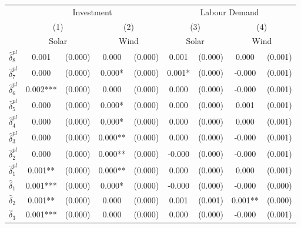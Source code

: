 {
\def\sym#1{\ifmmode^{#1}\else\(^{#1}\)\fi}
\begin{tabular}{l*{4}{cc}}
\toprule
            &\multicolumn{4}{c}{Investment}                           &\multicolumn{4}{c}{Labour Demand}                        \\\cmidrule(lr){2-5}\cmidrule(lr){6-9}
            &\multicolumn{2}{c}{(1)}     &\multicolumn{2}{c}{(2)}     &\multicolumn{2}{c}{(3)}     &\multicolumn{2}{c}{(4)}     \\
            &\multicolumn{2}{c}{Solar}   &\multicolumn{2}{c}{Wind}    &\multicolumn{2}{c}{Solar}   &\multicolumn{2}{c}{Wind}    \\
\midrule
$\hat{\delta}_8^{pl}$&       0.001   &     (0.000)&       0.000   &     (0.000)&       0.001   &     (0.000)&       0.000   &     (0.001)\\
$\hat{\delta}_7^{pl}$&       0.000   &     (0.000)&       0.000*  &     (0.000)&       0.001*  &     (0.000)&      -0.000   &     (0.001)\\
$\hat{\delta}_6^{pl}$&       0.002***&     (0.000)&       0.000   &     (0.000)&       0.000   &     (0.000)&      -0.000   &     (0.001)\\
$\hat{\delta}_5^{pl}$&       0.000   &     (0.000)&       0.000*  &     (0.000)&       0.000   &     (0.000)&       0.001   &     (0.001)\\
$\hat{\delta}_4^{pl}$&       0.000   &     (0.000)&       0.000*  &     (0.000)&       0.000   &     (0.000)&       0.000   &     (0.001)\\
$\hat{\delta}_3^{pl}$&       0.000   &     (0.000)&       0.000** &     (0.000)&       0.000   &     (0.000)&      -0.000   &     (0.001)\\
$\hat{\delta}_2^{pl}$&       0.000   &     (0.000)&       0.000** &     (0.000)&      -0.000   &     (0.000)&      -0.000   &     (0.001)\\
$\hat{\delta}_1^{pl}$&       0.001** &     (0.000)&       0.000** &     (0.000)&       0.000   &     (0.000)&       0.000   &     (0.001)\\
$\hat{\delta}_1$&       0.001***&     (0.000)&       0.000*  &     (0.000)&      -0.000   &     (0.000)&      -0.000   &     (0.000)\\
$\hat{\delta}_2$&       0.001** &     (0.000)&       0.000   &     (0.000)&       0.001   &     (0.001)&       0.001** &     (0.000)\\
$\hat{\delta}_3$&       0.001***&     (0.000)&       0.000   &     (0.000)&       0.000   &     (0.000)&      -0.000   &     (0.001)\\

\end{tabular}}
